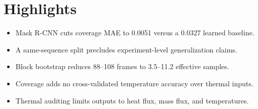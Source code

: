 \section*{Highlights}

\begin{itemize}
\item Mask R-CNN cuts coverage MAE to 0.0051 versus a 0.0327 learned baseline.
\item A same-sequence split precludes experiment-level generalization claims.
\item Block bootstrap reduces 88--108 frames to 3.5--11.2 effective samples.
\item Coverage adds no cross-validated temperature accuracy over thermal inputs.
\item Thermal auditing limits outputs to heat flux, mass flux, and temperatures.
\end{itemize}

